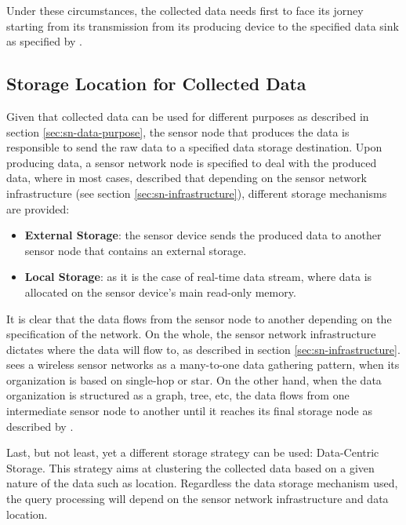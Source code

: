 Under these circumstances, the collected data needs first to face its jorney
starting from its transmission from its producing device to the specified data 
sink as specified by \cite{sn-storage01} \cite{sn-storage02} \cite{sn-storage03}.

\subsection{Storage Location for Collected Data}
\label{sec:sn-storage-locations}

Given that collected data can be used for different purposes as described in
section \ref{sec:sn-data-purpose}, the sensor node that produces the data is
responsible to send the raw data to a specified data storage destination. Upon
producing data, a sensor network node is specified to deal with the produced
data, where in most cases, \cite{sn-storage03} described that depending on the
sensor network infrastructure (see section \ref{sec:sn-infrastructure}),
different storage mechanisms are provided:

\begin{itemize}
  \item \textbf{External Storage}: the sensor device sends the produced data to
  another sensor node that contains an external storage. 
  \item \textbf{Local Storage}: as it is the case of real-time data stream, where data
  is allocated on the sensor device's main read-only memory.
\end{itemize}

It is clear that the data flows from the sensor node to another depending on
the specification of the network. On the whole, the sensor network
infrastructure dictates where the data will flow to, as described in section
\ref{sec:sn-infrastructure}. \cite{sn-storage02} sees a wireless sensor
networks as a many-to-one data gathering pattern, when its organization is
based on single-hop or star. On the other hand, when the data organization is
structured as a graph, tree, etc, the data flows from one intermediate sensor
node to another until it reaches its final storage node as described by
\cite{sn-storage01} \cite{sn-storage03}. 

Last, but not least, yet a different storage strategy can be used: Data-Centric
Storage. This strategy aims at clustering the collected data based on a given nature of the
data such as location. Regardless the data storage mechanism used, the query
processing will depend on the sensor network infrastructure and data location.

